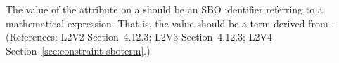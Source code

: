 The value of the  attribute on a \Constraint should be an SBO
identifier referring to a mathematical expression.  That is, the value should
be a term derived from \sbomathformula.  (References: L2V2 Section~4.12.3;
L2V3 Section~4.12.3; L2V4 Section~\ref{sec:constraint-sboterm}.)

